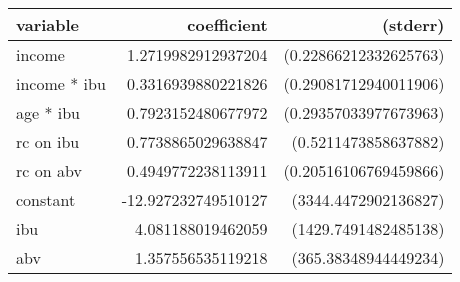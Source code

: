 \begin{tabular}{lrr}
\textbf{variable}&\textbf{coefficient}&\textbf{(stderr)}\\
\hline

income&1.2719982912937204&(0.22866212332625763)\\
income * ibu&0.3316939880221826&(0.29081712940011906)\\
age * ibu&0.7923152480677972&(0.29357033977673963)\\
rc on ibu&0.7738865029638847&(0.5211473858637882)\\
rc on abv&0.4949772238113911&(0.20516106769459866)\\
constant&-12.927232749510127&(3344.4472902136827)\\
ibu&4.081188019462059&(1429.7491482485138)\\
abv&1.357556535119218&(365.38348944449234)\\
\end{tabular}

